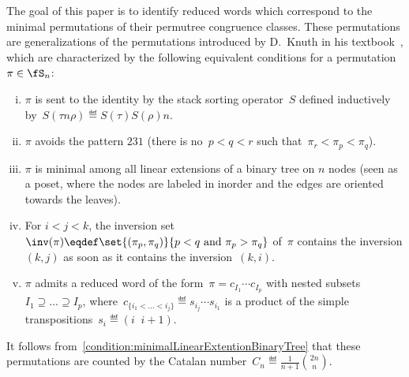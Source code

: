 The goal of this paper is to identify reduced words which correspond to the minimal permutations of their permutree congruence classes.
These permutations are generalizations of the  permutations introduced by D.~Knuth in his textbook~\cite[Sect.~2.2.1]{Knuth-TAOCP1}, which are characterized by the following equivalent conditions for a permutation~$\pi \in \fS_n$:
\begin{enumerate}[(i)]
\item \label{condition:stackSorting}
$\pi$ is sent to the identity by the stack sorting operator~$S$ defined inductively by~$S(\tau n \rho) \eqdef S(\tau) S(\rho) n$.
\item \label{condition:patternStack}
$\pi$ avoids the pattern $231$ (\ie there is no~$p < q < r$ such that~$\pi_r < \pi_p < \pi_q$).
\item \label{condition:minimalLinearExtentionBinaryTree}
$\pi$ is minimal among all linear extensions of a binary tree on $n$ nodes (seen as a poset, where the nodes are labeled in inorder and the edges are oriented towards the leaves).
\item \label{condition:alignedStack}
For $i < j < k$, the inversion set~$\inv(\pi) \eqdef \set{(\pi_p, \pi_q)}{p < q \text{ and } \pi_p > \pi_q}$ of~$\pi$ contains the inversion $(k,j)$ as soon as it contains the inversion~$(k,i)$.
\item \label{condition:sortableStack}
$\pi$ admits a reduced word of the form~$\pi = c_{I_1} \cdots c_{I_p}$ with nested subsets ${I_1 \supseteq \dots \supseteq I_p}$, where~$c_{\{i_1 < \dots < i_j\}} \eqdef s_{i_j} \cdots s_{i_1}$ is a product of the simple transpositions~$s_i \eqdef (i \;\; i+1)$.
\end{enumerate}
It follows from~\ref{condition:minimalLinearExtentionBinaryTree} that these permutations are counted by the Catalan number~$C_n \eqdef \frac{1}{n+1} \binom{2n}{n}$.

